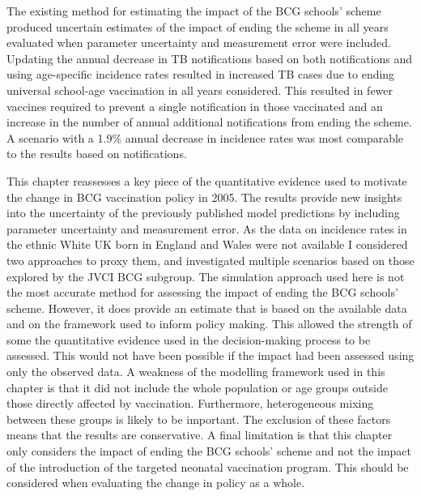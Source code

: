 \documentclass[11pt,twoside]{bristolthesis}
\begin{document}
  The existing method for estimating the impact of the BCG schools' scheme produced uncertain estimates of the impact of ending the scheme in all years evaluated when parameter uncertainty and measurement error were included. Updating the annual decrease in TB notifications based on both notifications and using age-specific incidence rates resulted in increased TB cases due to ending universal school-age vaccination in all years considered. This resulted in fewer vaccines required to prevent a single notification in those vaccinated and an increase in the number of annual additional notifications from ending the scheme. A scenario with a 1.9\% annual decrease in incidence rates was most comparable to the results based on notifications.
  
  This chapter reassesses a key piece of the quantitative evidence used to motivate the change in BCG vaccination policy in 2005. The results provide new insights into the uncertainty of the previously published model predictions by including parameter uncertainty and measurement error. As the data on incidence rates in the ethnic White UK born in England and Wales were not available I considered two approaches to proxy them, and investigated multiple scenarios based on those explored by the JVCI BCG subgroup. The simulation approach used here is not the most accurate method for assessing the impact of ending the BCG schools' scheme. However, it does provide an estimate that is based on the available data and on the framework used to inform policy making. This allowed the strength of some the quantitative evidence used in the decision-making process to be assessed. This would not have been possible if the impact had been assessed using only the observed data. A weakness of the modelling framework used in this chapter is that it did not include the whole population or age groups outside those directly affected by vaccination. Furthermore, heterogeneous mixing between these groups is likely to be important. The exclusion of these factors means that the results are conservative. A final limitation is that this chapter only considers the impact of ending the BCG schools' scheme and not the impact of the introduction of the targeted neonatal vaccination program. This should be considered when evaluating the change in policy as a whole.
  
\end{document}

